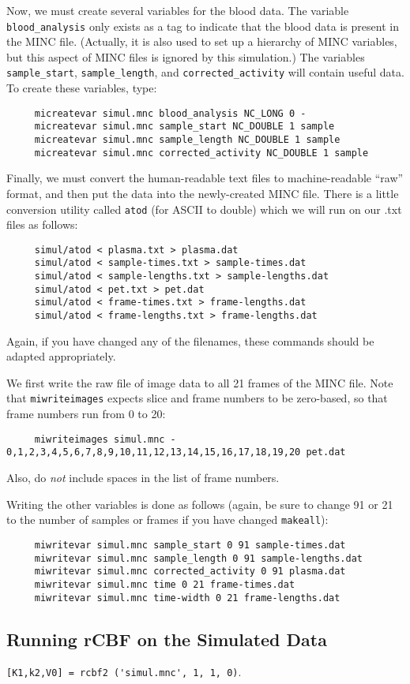 \documentclass[11pt]{article}
\begin{document}
Now, we must create several variables for the blood data.  The
variable \verb|blood_analysis| only exists as a tag to indicate that
the blood data is present in the MINC file.  (Actually, it is also
used to set up a hierarchy of MINC variables, but this aspect of MINC
files is ignored by this simulation.) The variables
\verb|sample_start|, \verb|sample_length|, and
\verb|corrected_activity| will contain useful data.  To create these
variables, type:
\begin{verbatim}
     micreatevar simul.mnc blood_analysis NC_LONG 0 -
     micreatevar simul.mnc sample_start NC_DOUBLE 1 sample
     micreatevar simul.mnc sample_length NC_DOUBLE 1 sample
     micreatevar simul.mnc corrected_activity NC_DOUBLE 1 sample
\end{verbatim}

Finally, we must convert the human-readable text files to
machine-readable ``raw'' format, and then put the data into the
newly-created MINC file.  There is a little conversion utility called
\verb|atod| (for ASCII to double) which we will run on our .txt files
as follows:
\begin{verbatim}
     simul/atod < plasma.txt > plasma.dat
     simul/atod < sample-times.txt > sample-times.dat
     simul/atod < sample-lengths.txt > sample-lengths.dat
     simul/atod < pet.txt > pet.dat
     simul/atod < frame-times.txt > frame-lengths.dat
     simul/atod < frame-lengths.txt > frame-lengths.dat
\end{verbatim}
Again, if you have changed any of the filenames, these commands should
be adapted appropriately.

We first write the raw file of image data to all 21 frames of the MINC
file.  Note that \verb|miwriteimages| expects slice and frame numbers
to be zero-based, so that frame numbers run from 0 to 20:
\begin{verbatim}
     miwriteimages simul.mnc - 0,1,2,3,4,5,6,7,8,9,10,11,12,13,14,15,16,17,18,19,20 pet.dat
\end{verbatim}
Also, do {\em not} include spaces in the list of frame numbers.

Writing the other variables is done as follows (again, be sure to
change 91 or 21 to the number of samples or frames if you have changed
\verb|makeall|):
\begin{verbatim}
     miwritevar simul.mnc sample_start 0 91 sample-times.dat
     miwritevar simul.mnc sample_length 0 91 sample-lengths.dat
     miwritevar simul.mnc corrected_activity 0 91 plasma.dat
     miwritevar simul.mnc time 0 21 frame-times.dat
     miwritevar simul.mnc time-width 0 21 frame-lengths.dat
\end{verbatim}

\subsection{Running rCBF on the Simulated Data}

\verb|[K1,k2,V0] = rcbf2 ('simul.mnc', 1, 1, 0)|.
\end{document}
